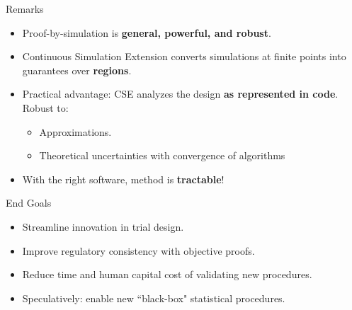 \begin{frame}{Remarks}
\begin{itemize}
    \item Proof-by-simulation is \textbf{general, powerful, and robust}.
    \item Continuous Simulation Extension converts
        simulations at finite points
        into guarantees over \textbf{regions}.

    \item Practical advantage: CSE analyzes the design 
        \textbf{as represented in code}. Robust to:
        \begin{itemize}
            \item Approximations.
            \item Theoretical uncertainties with convergence of algorithms
        \end{itemize}
    \item With the right software, method is \textbf{tractable}!
\end{itemize} 
\end{frame}

\begin{frame}{End Goals}
\begin{itemize}
    \item Streamline innovation in trial design.
    \item Improve regulatory consistency with objective proofs.
    \item Reduce time and human capital cost of validating new procedures.
    \item Speculatively: enable new ``black-box" statistical procedures.
\end{itemize}
\end{frame}
